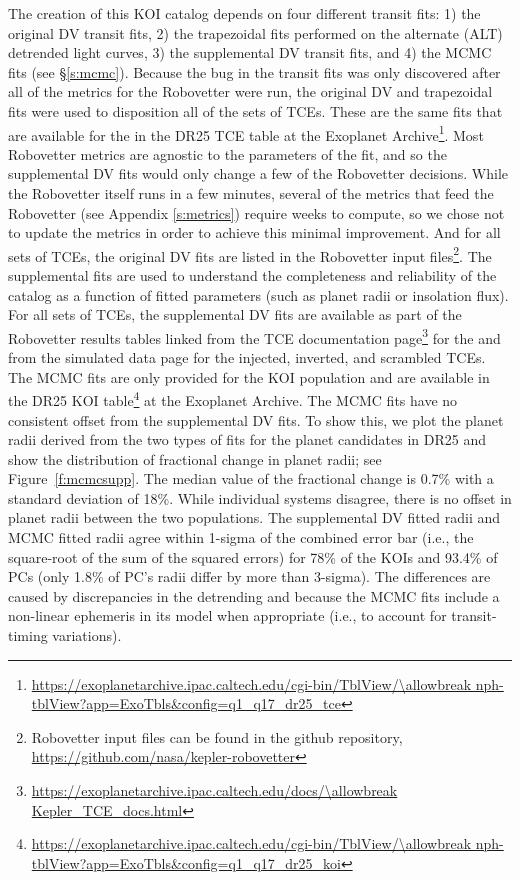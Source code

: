 The creation of this KOI catalog depends on four different transit fits: 1) the original DV transit fits, 2) the trapezoidal fits performed on the alternate (ALT) \citet{Garcia2010} detrended light curves, 3) the supplemental DV transit fits, and 4) the MCMC fits (see \S\ref{s:mcmc}).  Because the bug in the transit fits was only discovered after all of the metrics for the Robovetter were run, the original DV and trapezoidal fits were used to disposition all of the sets of TCEs. These are the same fits that are available for the  in the DR25 TCE table at the Exoplanet Archive\footnote{\url{https://exoplanetarchive.ipac.caltech.edu/cgi-bin/TblView/\allowbreak nph-tblView?app=ExoTbls\&config=q1\_q17\_dr25\_tce}}. Most Robovetter metrics are agnostic to the parameters of the fit, and so the supplemental DV fits would only change a few of the Robovetter decisions. While the Robovetter itself runs in a few minutes, several of the metrics that feed the Robovetter (see Appendix \ref{s:metrics}) require weeks to compute, so we chose not to update the metrics in order to achieve this minimal improvement. And for all sets of TCEs, the original DV fits are listed in the Robovetter input files\footnote{Robovetter input files can be found in the github repository, \label{rvgithubfn}\url{https://github.com/nasa/kepler-robovetter}}. The supplemental fits are used to understand the completeness and reliability of the catalog as a function of fitted parameters (such as planet radii or insolation flux). For all sets of TCEs, the supplemental DV fits are available as part of the Robovetter results tables linked from the TCE documentation page\footnote{\url{https://exoplanetarchive.ipac.caltech.edu/docs/\allowbreak Kepler\_TCE\_docs.html}} for the  and from the simulated data page\footnotemark[\ref{kepsimpagefn}] \citep[see][]{Christiansen2017,Coughlin2017a} for the injected, inverted, and scrambled TCEs. The MCMC fits are only provided for the KOI population and are available in the DR25 KOI table\footnote{\url{https://exoplanetarchive.ipac.caltech.edu/cgi-bin/TblView/\allowbreak nph-tblView?app=ExoTbls\&config=q1\_q17\_dr25\_koi}} at the Exoplanet Archive. The MCMC fits have no consistent offset from the supplemental DV fits.  To show this, we plot the planet radii derived from the two types of fits for the planet candidates in DR25 and show the distribution of fractional change in planet radii; see Figure~\ref{f:mcmcsupp}. The median value of the fractional change is 0.7\% with a standard deviation of 18\%. While individual systems disagree, there is no offset in planet radii between the two populations. The supplemental DV fitted radii and MCMC fitted radii agree within 1-sigma of the combined error bar (i.e., the square-root of the sum of the squared errors) for 78\% of the KOIs and 93.4\% of PCs (only 1.8\% of PC's radii differ by more than 3-sigma).  The differences are caused by discrepancies in the detrending and because the MCMC fits include a non-linear ephemeris in its model when appropriate (i.e., to account for transit-timing variations).

